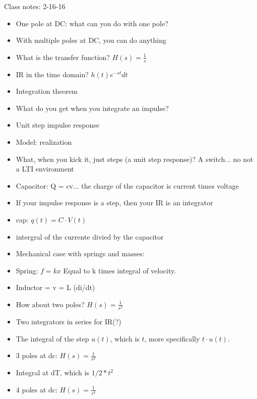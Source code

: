 Class notes: 2-16-16

\begin{itemize}
\item{One pole at DC: what can you do with one pole?}
\item{With multiple poles at DC, you can do anything}
\item{What is the transfer function? $H(s) = \frac{1}{s}$}
\item{IR in the time domain? $h(t)e^{-st}dt$}
\item{Integration theorem}
\item{What do you get when you integrate an impulse?}
\item{Unit step impulse response}
\item{Model: realization} %
\item{What, when you kick it, just steps (a unit step response)? A switch... no not a LTI environment}
\item{Capacitor: Q = cv... the charge of the capacitor is current times voltage}
\item{If your impulse response is a step, then your IR is an integrator}


\item{cap: $q(t) = C \cdot V(t)$}
\item{intergral of the currente divied by the capacitor}


\item{Mechanical case with springs and masses:
}

\item{Spring: $f = kx$
    Equal to k times integral of velocity.
}

\item{
    Inductor = v = L (di/dt)
}

\item{
How about two poles? $H(s) = \frac{1}{s^2}$
}

\item{
Two integrators in series for IR(?)
}

\item{
The integral of the step $u(t)$, which is $t$, more specifically $t \cdot u(t)$. 
}

\item{
3 poles at dc: $H(s) = \frac{1}{s^3}$
}

\item{
Integral at dT, which is $1/2 * t^2$
}

\item{
4 poles at dc: $H(s) = \frac{1}{s^4}$
}


\end{itemize}
